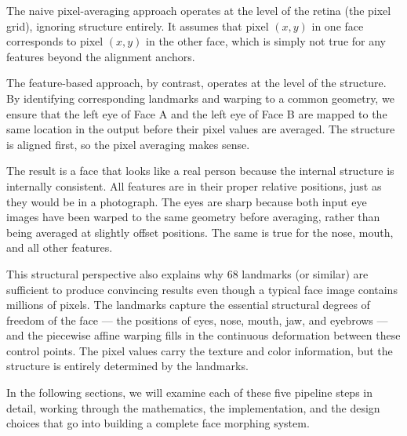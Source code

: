 The naive pixel-averaging approach operates at the level of the retina (the pixel grid), ignoring
structure entirely. It assumes that pixel $(x, y)$ in one face corresponds to pixel $(x, y)$ in
the other face, which is simply not true for any features beyond the alignment anchors.

The feature-based approach, by contrast, operates at the level of the structure. By identifying
corresponding landmarks and warping to a common geometry, we ensure that the left eye of Face A
and the left eye of Face B are mapped to the same location in the output before their pixel
values are averaged. The structure is aligned first, so the pixel averaging makes sense.

The result is a face that looks like a real person because the internal structure is internally
consistent. All features are in their proper relative positions, just as they would be in a
photograph. The eyes are sharp because both input eye images have been warped to the same
geometry before averaging, rather than being averaged at slightly offset positions. The same is
true for the nose, mouth, and all other features.

This structural perspective also explains why 68 landmarks (or similar) are sufficient to produce
convincing results even though a typical face image contains millions of pixels. The landmarks
capture the essential structural degrees of freedom of the face --- the positions of eyes, nose,
mouth, jaw, and eyebrows --- and the piecewise affine warping fills in the continuous deformation
between these control points. The pixel values carry the texture and color information, but the
structure is entirely determined by the landmarks.

In the following sections, we will examine each of these five pipeline steps in detail, working
through the mathematics, the implementation, and the design choices that go into building a
complete face morphing system.


\endinput
